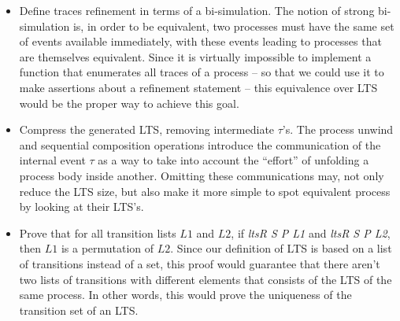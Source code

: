\begin{itemize}
	\item Define traces refinement in terms of a bi-simulation. The notion of strong bi-simulation is, in order to be equivalent, two processes must have the same set of events available immediately, with these events leading to processes that are themselves equivalent. Since it is virtually impossible to implement a function that enumerates all traces of a process -- so that we could use it to make assertions about a refinement statement -- this equivalence over LTS would be the proper way to achieve this goal.
	\item Compress the generated LTS, removing intermediate $ \tau $'s. The process unwind and sequential composition operations introduce the communication of the internal event $ \tau $ as a way to take into account the ``effort'' of unfolding a process body inside another. Omitting these communications may, not only reduce the LTS size, but also make it more simple to spot equivalent process by looking at their LTS's.
	\item Prove that for all transition lists $ L1 $ and $ L2 $, if \emph{ltsR S P L1} and \emph{ltsR S P L2}, then $ L1 $ is a permutation of $ L2 $. Since our definition of LTS is based on a list of transitions instead of a set, this proof would guarantee that there aren't two lists of transitions with different elements that consists of the LTS of the same process. In other words, this would prove the uniqueness of the transition set of an LTS.
\end{itemize}